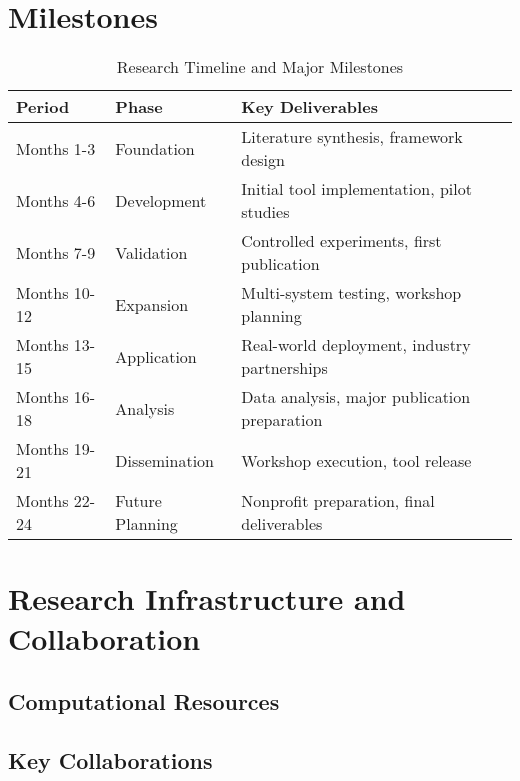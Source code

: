\documentclass[11pt,a4paper]{article}
\begin{document}
\section{Milestones}
\begin{table}[h]
    \centering
    \begin{tabular}{|l|l|p{8cm}|}
    \hline
    \textbf{Period} & \textbf{Phase} & \textbf{Key Deliverables} \\
    \hline
    Months 1-3 & Foundation & Literature synthesis, framework design \\
    \hline
    Months 4-6 & Development & Initial tool implementation, pilot studies \\
    \hline
    Months 7-9 & Validation & Controlled experiments, first publication \\
    \hline
    Months 10-12 & Expansion & Multi-system testing, workshop planning \\
    \hline
    Months 13-15 & Application & Real-world deployment, industry partnerships \\
    \hline
    Months 16-18 & Analysis & Data analysis, major publication preparation \\
    \hline
    Months 19-21 & Dissemination & Workshop execution, tool release \\
    \hline
    Months 22-24 & Future Planning & Nonprofit preparation, final deliverables \\
    \hline
    \end{tabular}
    \caption{Research Timeline and Major Milestones}
    \label{tab:timeline}
    \end{table}
    \section{Research Infrastructure and Collaboration}

    \subsection{Computational Resources}
    
    
    \subsection{Key Collaborations}
    
\end{document}
